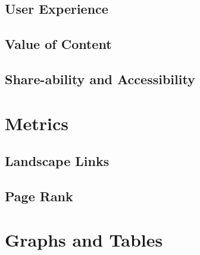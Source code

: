 \documentclass[fleqn,10pt]{SelfArx} %
\begin{document}
\subsection{User Experience}
\subsection{Value of Content}
\subsection{Share-ability and Accessibility}

\section{Metrics}
\subsection*{ Landscape Links}
\subsection*{ Page Rank}



\section{Graphs and Tables}






%
%

\end{document}
